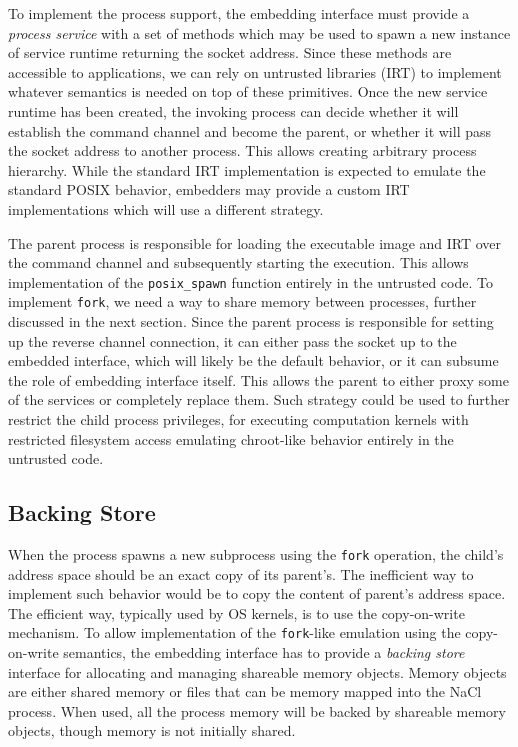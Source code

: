 
To implement the process support, the embedding interface must provide a
\emph{process service} with a set of methods which may be used to spawn
a new instance of service runtime returning the socket address. Since
these methods are accessible to applications, we can rely on untrusted
libraries (\ie IRT) to implement whatever semantics is needed on top of
these primitives. Once the new service runtime has been created, the
invoking process can decide whether it will establish the command
channel and become the parent, or whether it will pass the socket
address to another process.  This allows creating arbitrary process
hierarchy.  While the standard IRT implementation is expected to emulate
the standard POSIX behavior, embedders may provide a custom IRT
implementations which will use a different strategy.

The parent process is responsible for loading the executable image and
IRT over the command channel and subsequently starting the execution.
This allows implementation of the \lstinline`posix_spawn` function
entirely in the untrusted code. To implement \lstinline`fork`, we need a
way to share memory between processes, further discussed in the next
section.  Since the parent process is responsible for setting up the
reverse channel connection, it can either pass the socket up to the
embedded interface, which will likely be the default behavior, or it can
subsume the role of embedding interface itself. This allows the parent
to either proxy some of the services or completely replace them. Such
strategy could be used to further restrict the child process privileges,
\eg for executing computation kernels with restricted filesystem access
emulating chroot-like behavior entirely in the untrusted code.

\subsection{Backing Store}
\label{sub:backing_store}

When the process spawns a new subprocess using the \lstinline`fork`
operation, the child's address space should be an exact copy of its
parent's.  The inefficient way to implement such behavior would be to
copy the content of parent's address space. The efficient way,
typically used by OS kernels, is to use the copy-on-write mechanism.
To allow implementation of the \lstinline`fork`-like emulation using
the copy-on-write semantics, the embedding interface has to provide a
\emph{backing store} interface for allocating and managing shareable
memory objects. Memory objects are either shared memory or files that
can be memory mapped into the NaCl process. When used, all the process
memory will be backed by shareable memory objects, though memory is
not initially shared.

